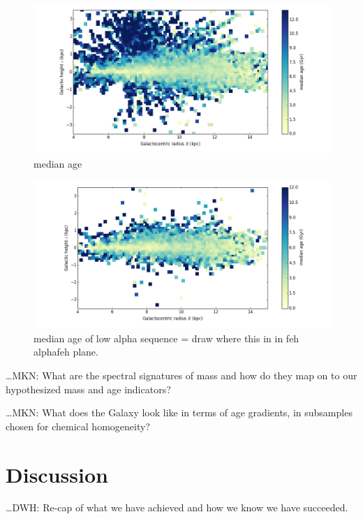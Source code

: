 \documentclass[12pt, preprint]{aastex}
\begin{document}
\begin{figure}[p!]
\centering
    \includegraphics[scale=0.5]{./plots/median_age_abs.png}
    \caption{median age  }
\label{fig:alphabins}
\end{figure}

\begin{figure}[p!]
\centering
    \includegraphics[scale=0.5]{./plots/median_age_low_alpha_abs.png}
    \caption{median age of low alpha sequence = draw where this in in feh alphafeh plane. }
\label{fig:alphabins}
\end{figure}

\ldots MKN: What are the spectral signatures of mass and how do they
map on to our hypothesized mass and age indicators?


\ldots MKN: What does the Galaxy look like in terms of age gradients,
in subsamples chosen for chemical homogeneity?

\section{Discussion}

\ldots DWH: Re-cap of what we have achieved and how we know we have
succeeded.
\end{document}
